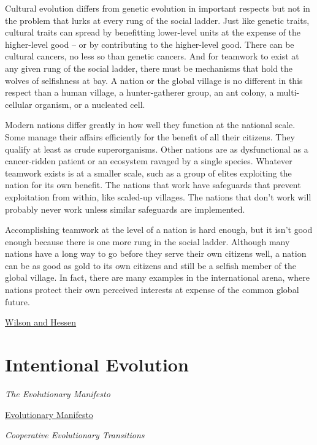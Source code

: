 \documentclass[
]{book}
\begin{document}
Cultural evolution differs from genetic evolution in important respects but not in the problem that lurks at every rung of the social ladder. Just like genetic traits, cultural traits can spread by benefitting lower-level units at the expense of the higher-level good -- or by contributing to the higher-level good. There can be cultural cancers, no less so than genetic cancers. And for teamwork to exist at any given rung of the social ladder, there must be mechanisms that hold the wolves of selfishness at bay. A nation or the global village is no different in this respect than a human village, a hunter-gatherer group, an ant colony, a multi-cellular organism, or a nucleated cell.

Modern nations differ greatly in how well they function at the national scale. Some manage their affairs efficiently for the benefit of all their citizens. They qualify at least as crude superorganisms. Other nations are as dysfunctional as a cancer-ridden patient or an ecosystem ravaged by a single species. Whatever teamwork exists is at a smaller scale, such as a group of elites exploiting the nation for its own benefit. The nations that work have safeguards that prevent exploitation from within, like scaled-up villages. The nations that don't work will probably never work unless similar safeguards are implemented.

Accomplishing teamwork at the level of a nation is hard enough, but it isn't good enough because there is one more rung in the social ladder. Although many nations have a long way to go before they serve their own citizens well, a nation can be as good as gold to its own citizens and still be a selfish member of the global village. In fact, there are many examples in the international arena, where nations protect their own perceived interests at expense of the common global future.

\href{https://evonomics.com/norway-toxic-trickle-down-david-sloan-wilson/}{Wilson and Hessen}

\hypertarget{intentional-evolution}{%
\section{Intentional Evolution}\label{intentional-evolution}}

\emph{The Evolutionary Manifesto}

\href{http://www.evolutionarymanifesto.com/}{Evolutionary Manifesto}

\emph{Cooperative Evolutionary Transitions}
\end{document}
